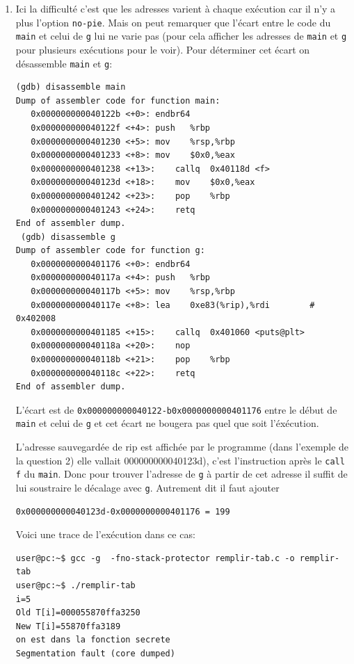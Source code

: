 \documentclass[a4paper,9pt]{article}
\newenvironment{terminal}{\color{black}\begin{snugshade*}}
{\end{snugshade*}\color{black}}
\theoremstyle{plain}
\theoremstyle{definition}
\begin{document}
\begin{correction}
\begin{enumerate}
\item Ici la difficulté c'est que les adresses varient à chaque exécution car il n'y a plus l'option \verb|no-pie|. Mais on peut remarquer que l'écart entre le code du \verb|main| et celui de \verb|g| lui ne varie pas (pour cela afficher les adresses de \verb|main| et \verb|g| pour plusieurs exécutions pour le voir). Pour déterminer cet écart on désassemble \verb|main| et \verb|g|:
\begin{terminal}
\begin{verbatim}
(gdb) disassemble main
Dump of assembler code for function main:
   0x000000000040122b <+0>:	endbr64 
   0x000000000040122f <+4>:	push   %rbp
   0x0000000000401230 <+5>:	mov    %rsp,%rbp
   0x0000000000401233 <+8>:	mov    $0x0,%eax
   0x0000000000401238 <+13>:	callq  0x40118d <f>
   0x000000000040123d <+18>:	mov    $0x0,%eax
   0x0000000000401242 <+23>:	pop    %rbp
   0x0000000000401243 <+24>:	retq   
End of assembler dump.
 (gdb) disassemble g
Dump of assembler code for function g:
   0x0000000000401176 <+0>:	endbr64 
   0x000000000040117a <+4>:	push   %rbp
   0x000000000040117b <+5>:	mov    %rsp,%rbp
   0x000000000040117e <+8>:	lea    0xe83(%rip),%rdi        # 0x402008
   0x0000000000401185 <+15>:	callq  0x401060 <puts@plt>
   0x000000000040118a <+20>:	nop
   0x000000000040118b <+21>:	pop    %rbp
   0x000000000040118c <+22>:	retq   
End of assembler dump.
\end{verbatim}
\end{terminal}
L'écart est de \verb|0x000000000040122-b0x0000000000401176| entre le début de \verb|main| et celui de \verb|g| et cet écart ne bougera pas quel que soit l'éxécution. 


L'adresse sauvegardée de rip est affichée par le programme (dans l'exemple de la question 2)  elle vallait 000000000040123d), c'est l'instruction après le \verb|call f| du \verb|main|. Donc pour trouver l'adresse de \verb|g| à partir de cet adresse  il suffit de lui soustraire le décalage avec \verb|g|. Autrement dit il faut ajouter
\begin{verbatim}
0x000000000040123d-0x0000000000401176 = 199
\end{verbatim}
Voici une trace de l'exécution dans ce cas:
\begin{terminal}
\begin{verbatim}
user@pc:~$ gcc -g  -fno-stack-protector remplir-tab.c -o remplir-tab
user@pc:~$ ./remplir-tab 
i=5
Old T[i]=000055870ffa3250
New T[i]=55870ffa3189
on est dans la fonction secrete
Segmentation fault (core dumped)
\end{verbatim}
\end{terminal}
\end{enumerate}

\end{correction}
\end{document}
